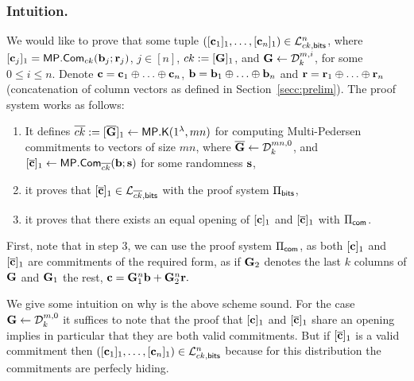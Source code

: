 \subsubsection{Intuition.} We would like to prove that some tuple
$([\mathbf{c}_1]_1,\ldots, [\mathbf{c}_n]_1) \in \mathcal{L}_{ck,\mathsf{bits}}^n$, where $[\mathbf{c}_j]_1=\mathsf{MP}.\mathsf{Com}_{ck}(\mathbf{b}_j;\mathbf{r}_j)$, $j \in [n]$, $ck:=[\mathbf{{G}}]_1$, and $\mathbf{{G}} \gets \mathcal{D}_k^{m,i}$, for some $0 \leq i \leq n$. 
Denote $\mathbf{c}=\mathbf{c}_1 \oplus \ldots \oplus \mathbf{c}_n$, $\mathbf{b}=\mathbf{b}_1 \oplus \ldots \oplus \mathbf{b}_n$ and $\mathbf{r}=\mathbf{r}_1 \oplus \ldots \oplus \mathbf{r}_n$ (concatenation of column vectors as defined in Section~\ref{secc:prelim}). The proof system works as follows:
\begin{enumerate}
\item It defines  
 $\overline{ck}:=[\overline{\mathbf{{G}}}]_1\gets\mathsf{MP}.\mathsf{K}(1^\lambda,mn)$ for computing Multi-Pedersen commitments to vectors of size $mn$, where $\overline{\mathbf{{G}}} \leftarrow 
\mathcal{D}_k^{mn,0}$, and  $[{\overline{\mathbf{c}}}]_1\gets\mathsf{MP}.\mathsf{Com}_{\overline{ck}}(\mathbf{b};\mathbf{s})$ for some 
randomness $\mathbf{s}$, 
\item it proves that $[{\overline{\mathbf{c}}}]_1\in\mathcal{L}_{\overline{ck},\mathsf{bits}}$ with the proof system $\Pi_{\mathsf{bits}}$,
\item it  proves that there exists an equal opening of $[\mathbf{c}]_1$ and $[{\overline{\mathbf{c}}}]_1$ with  $\Pi_{\mathsf{com}}$.
\end{enumerate}
First, note that in step 3, we can use the proof system $\Pi_{\mathsf{com}}$, as both $[\mathbf{c}]_1$ and $[{\overline{\mathbf{c}}}]_1$ are commitments of the required form, as if $\mathbf{{G}}_2$ denotes the last $k$ columns 
of $\mathbf{{G}}$ and $\mathbf{{G}}_1$ the rest,
$\mathbf{c}=\mathbf{{G}}_1^n\mathbf{b}+\mathbf{{G}}_2^n\mathbf{r}.
$

We give some intuition on why is the above scheme sound. For the case $\mathbf{{G}} \gets \mathcal{D}_k^{m,0}$ it suffices to note that the proof that  $[\mathbf{c}]_1$ and $[{\overline{\mathbf{c}}}]_1$ share an opening implies in particular that they are both valid commitments. But if 
$[{\overline{\mathbf{c}}}]_1$ is a valid commitment then $([\mathbf{c}_1]_1,\ldots, [\mathbf{c}_n]_1) \in \mathcal{L}_{ck,\mathsf{bits}}^n$ because for this distribution the commitments are perfecly hiding. 

